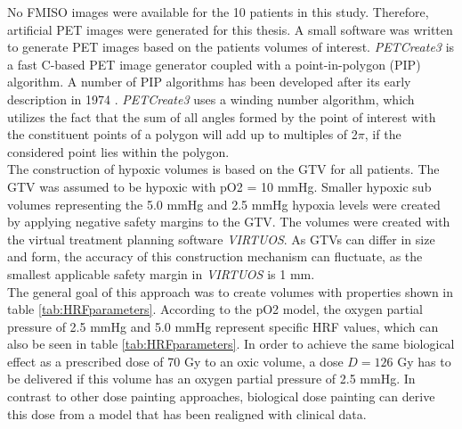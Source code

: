 No FMISO images were available for the 10 patients in this study. Therefore, artificial PET images were generated for this thesis. A small software was written to generate PET images based on the patients volumes of interest. \textit{PETCreate3} is a fast C-based PET image generator coupled with a point-in-polygon (PIP) algorithm. A number of PIP algorithms has been developed after its early description in 1974 \cite{Sutherland}. \textit{PETCreate3} uses a winding number algorithm, which utilizes the fact that the sum of all angles formed by the point of interest with the constituent points of a polygon will add up to multiples of 2$\pi$, if the considered point lies within the polygon.\\The construction of hypoxic volumes is based on the GTV for all patients. The GTV was assumed to be hypoxic with  pO2 = 10 mmHg. Smaller hypoxic sub volumes representing the 5.0 mmHg and 2.5 mmHg hypoxia levels were created by applying negative safety margins to the GTV. The volumes were created with the virtual treatment planning software \textit{VIRTUOS}. As GTVs can differ in size and form, the accuracy of this construction mechanism can fluctuate, as the smallest applicable safety margin in \textit{VIRTUOS} is 1 mm.\\The general goal of this approach was to create volumes with properties shown in table \ref{tab:HRFparameters}. According to the pO2 model, the oxygen partial pressure of 2.5 mmHg and 5.0 mmHg represent specific HRF values, which can also be seen in table \ref{tab:HRFparameters}. In order to achieve the same biological effect as a prescribed dose of 70 Gy to an oxic volume, a dose $D = 126$ Gy has to be delivered if this volume has an oxygen partial pressure of 2.5 mmHg. In contrast to other dose painting approaches, biological dose painting can derive this dose from a model that has been realigned with clinical data.
